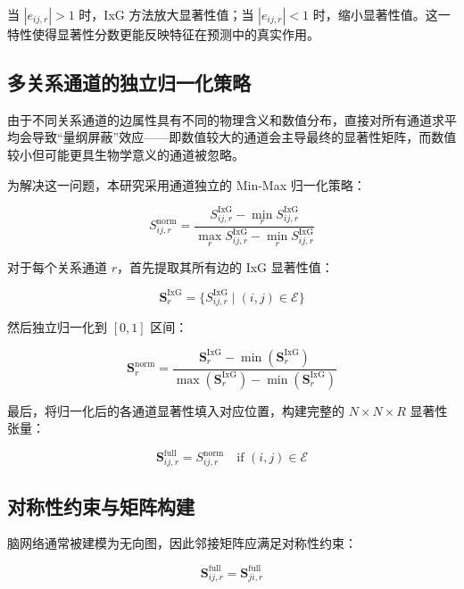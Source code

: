 \documentclass[UTF8, a4paper, 12pt]{article}
\begin{document}
当 $|e_{ij,r}| > 1$ 时，IxG 方法放大显著性值；当 $|e_{ij,r}| < 1$ 时，缩小显著性值。这一特性使得显著性分数更能反映特征在预测中的真实作用。

\subsection{多关系通道的独立归一化策略}

由于不同关系通道的边属性具有不同的物理含义和数值分布，直接对所有通道求平均会导致``量纲屏蔽''效应——即数值较大的通道会主导最终的显著性矩阵，而数值较小但可能更具生物学意义的通道被忽略。

为解决这一问题，本研究采用通道独立的 Min-Max 归一化策略：

\begin{equation}
S_{ij,r}^{\text{norm}} = \frac{S_{ij,r}^{\text{IxG}} - \min_r S_{ij,r}^{\text{IxG}}}{\max_r S_{ij,r}^{\text{IxG}} - \min_r S_{ij,r}^{\text{IxG}}}
\end{equation}

对于每个关系通道 $r$，首先提取其所有边的 IxG 显著性值：

\begin{equation}
\mathbf{S}_r^{\text{IxG}} = \{ S_{ij,r}^{\text{IxG}} \mid (i,j) \in \mathcal{E} \}
\end{equation}

然后独立归一化到 $[0, 1]$ 区间：

\begin{equation}
\mathbf{S}_r^{\text{norm}} = \frac{\mathbf{S}_r^{\text{IxG}} - \min(\mathbf{S}_r^{\text{IxG}})}{\max(\mathbf{S}_r^{\text{IxG}}) - \min(\mathbf{S}_r^{\text{IxG}})}
\end{equation}

最后，将归一化后的各通道显著性填入对应位置，构建完整的 $N \times N \times R$ 显著性张量：

\begin{equation}
\mathbf{S}^{\text{full}}_{ij,r} = S_{ij,r}^{\text{norm}} \quad \text{if } (i,j) \in \mathcal{E}
\end{equation}

\subsection{对称性约束与矩阵构建}

脑网络通常被建模为无向图，因此邻接矩阵应满足对称性约束：

\begin{equation}
\mathbf{S}^{\text{full}}_{ij,r} = \mathbf{S}^{\text{full}}_{ji,r}
\end{equation}
\end{document}
